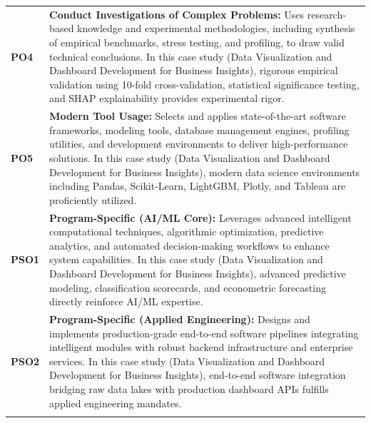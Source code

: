 {\begin{longtable}{@{}>{\centering\arraybackslash}p{1.8cm} p{13.2cm}@{}}
    \addlinespace
\textbf{PO4} & \textbf{Conduct Investigations of Complex Problems:} Uses research-based knowledge and experimental methodologies, including synthesis of empirical benchmarks, stress testing, and profiling, to draw valid technical conclusions. In this case study (Data Visualization and Dashboard Development for Business Insights), rigorous empirical validation using 10-fold cross-validation, statistical significance testing, and SHAP explainability provides experimental rigor. \\
    \addlinespace
\textbf{PO5} & \textbf{Modern Tool Usage:} Selects and applies state-of-the-art software frameworks, modeling tools, database management engines, profiling utilities, and development environments to deliver high-performance solutions. In this case study (Data Visualization and Dashboard Development for Business Insights), modern data science environments including Pandas, Scikit-Learn, LightGBM, Plotly, and Tableau are proficiently utilized. \\
    \addlinespace
\textbf{PSO1} & \textbf{Program-Specific (AI/ML Core):} Leverages advanced intelligent computational techniques, algorithmic optimization, predictive analytics, and automated decision-making workflows to enhance system capabilities. In this case study (Data Visualization and Dashboard Development for Business Insights), advanced predictive modeling, classification scorecards, and econometric forecasting directly reinforce AI/ML expertise. \\
    \addlinespace
\textbf{PSO2} & \textbf{Program-Specific (Applied Engineering):} Designs and implements production-grade end-to-end software pipelines integrating intelligent modules with robust backend infrastructure and enterprise services. In this case study (Data Visualization and Dashboard Development for Business Insights), end-to-end software integration bridging raw data lakes with production dashboard APIs fulfills applied engineering mandates. \\
    \addlinespace
    \bottomrule
\end{longtable}}